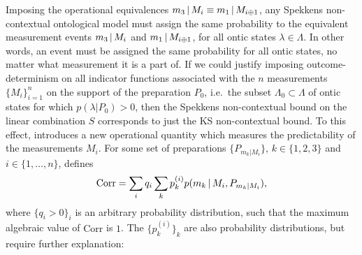 Imposing the operational equivalences $m_3\thinspace \vert \thinspace M_i\equiv m_1\thinspace \vert \thinspace M_{i\oplus 1}$, any Spekkens non-contextual ontological model must assign the same probability to the equivalent measurement events $m_3\thinspace \vert \thinspace M_i$ and $m_1\thinspace \vert \thinspace M_{i\oplus 1}$, for all ontic states $\lambda\in\Lambda$. In other words, an event must be assigned the same probability for all ontic states, no matter what measurement it is a part of. If we could justify imposing outcome-determinism on all indicator functions associated with the $n$ measurements $\{M_i\}_{i=1}^n$ on the support of the preparation $P_0$, i.e.\ the subset $\Lambda_0\subset\Lambda$ of ontic states for which $p(\lambda\vert P_0)>0$, then the Spekkens non-contextual bound on the linear combination $S$ corresponds to just the KS non-contextual bound. 
To this effect, \cite{Kunjwal2019} introduces a new operational quantity which measures the  predictability of the measurements $M_i$. For some set of preparations $\{P_{m_k\vert M_i}\}$, $k\in\{1,2,3\}$ and $i\in\{1,\dots,n\}$, \cite{Kunjwal2019} defines
\begin{equation}
\text{Corr} = \sum_i q_i \sum_{k} p_k^{(i)} p(m_k \thinspace\vert\thinspace M_i, P_{m_k\vert M_i}),
\end{equation}
where $\{q_i>0\}_i$ is an arbitrary probability distribution, such that the maximum algebraic value of $\text{Corr}$ is $1$. The $\{p_k^{(i)}\}_k$ are also probability distributions, but require further explanation:
